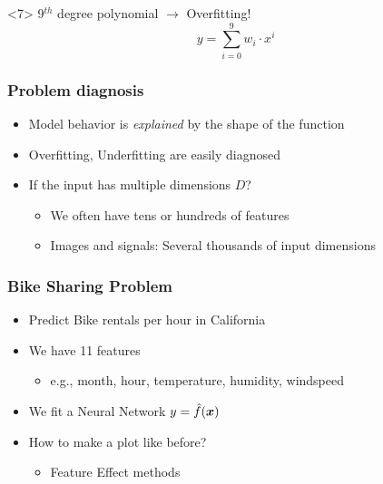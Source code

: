 \begin{frame}
\begin{onlyenv}
\begin{equation*}
    \end{equation*}
    \begin{center}
      \scalebox{0.5}{
        
      }
    \end{center}
  \end{onlyenv}
  \begin{onlyenv}<7>
    9$^{th}$ degree polynomial \(\rightarrow\) Overfitting!
    \begin{equation*}
      y = \sum_{i=0}^{9}w_i\cdot x^{i}
    \end{equation*}
    \begin{center}
      \scalebox{0.5}{
        
      }
    \end{center}
  \end{onlyenv}
\end{frame}

\begin{frame}
  \frametitle{Problem diagnosis}

  \begin{itemize}
  \item Model behavior is \emph{explained} by the shape of the function
  \item Overfitting, Underfitting are easily diagnosed
  \item If the input has multiple dimensions $D$?
    \begin{itemize}
    \item We often have tens or hundreds of features
    \item Images and signals: Several thousands of input dimensions
    \end{itemize}
  \end{itemize}
\end{frame}



\begin{frame}
  \frametitle{Bike Sharing Problem}

  \begin{itemize}
  \item Predict Bike rentals per hour in California
  \item We have 11 features
    \begin{itemize}
    \item e.g., month, hour, temperature, humidity, windspeed
    \end{itemize}
  \item We fit a Neural Network \(y = \hat{f}(\boldsymbol{x})\)
  \item How to make a plot like before?
    \begin{itemize}
    \item Feature Effect methods
    \end{itemize}
  \end{itemize}
\end{frame}


